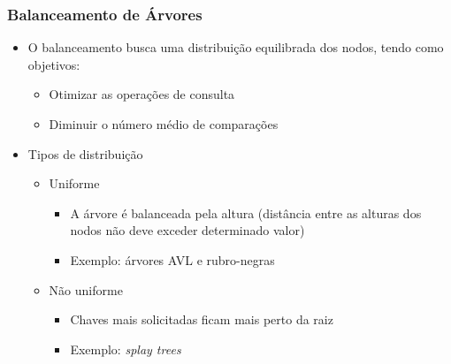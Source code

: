 \documentclass[aspectratio=169]{beamer}
\begin{document}
\begin{frame}\frametitle{Balanceamento de Árvores}
\begin{itemize}
	\item O balanceamento busca uma distribuição equilibrada dos nodos, tendo como objetivos:
	\begin{itemize}
		\item Otimizar as operações de consulta
		\item Diminuir o número médio de comparações
	\end{itemize}
	\item Tipos de distribuição
	\begin{itemize}
		\item Uniforme
		\begin{itemize}
			\item A árvore é balanceada pela altura (distância entre as alturas dos nodos não deve exceder determinado valor)
			\item Exemplo: árvores AVL e rubro-negras
		\end{itemize}
		\item Não uniforme
		\begin{itemize}
			\item Chaves mais solicitadas ficam mais perto da raiz
			\item Exemplo: \emph{splay trees}
		\end{itemize}
	\end{itemize}
\end{itemize}
\end{frame}
\end{document}
